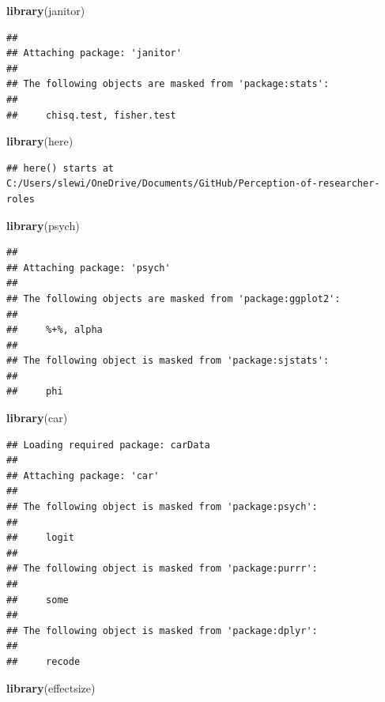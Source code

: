 \documentclass[
]{article}
\newenvironment{Shaded}{\begin{snugshade}}{\end{snugshade}}
\newcommand{\FunctionTok}[1]{\textcolor[rgb]{0.13,0.29,0.53}{\textbf{#1}}}
\newcommand{\NormalTok}[1]{#1}
\begin{document}
\begin{Shaded}
\begin{Highlighting}[]
\FunctionTok{library}\NormalTok{(janitor)}
\end{Highlighting}
\end{Shaded}

\begin{verbatim}
## 
## Attaching package: 'janitor'
## 
## The following objects are masked from 'package:stats':
## 
##     chisq.test, fisher.test
\end{verbatim}

\begin{Shaded}
\begin{Highlighting}[]
\FunctionTok{library}\NormalTok{(here)}
\end{Highlighting}
\end{Shaded}

\begin{verbatim}
## here() starts at C:/Users/slewi/OneDrive/Documents/GitHub/Perception-of-researcher-roles
\end{verbatim}

\begin{Shaded}
\begin{Highlighting}[]
\FunctionTok{library}\NormalTok{(psych)}
\end{Highlighting}
\end{Shaded}

\begin{verbatim}
## 
## Attaching package: 'psych'
## 
## The following objects are masked from 'package:ggplot2':
## 
##     %+%, alpha
## 
## The following object is masked from 'package:sjstats':
## 
##     phi
\end{verbatim}

\begin{Shaded}
\begin{Highlighting}[]
\FunctionTok{library}\NormalTok{(car)}
\end{Highlighting}
\end{Shaded}

\begin{verbatim}
## Loading required package: carData
## 
## Attaching package: 'car'
## 
## The following object is masked from 'package:psych':
## 
##     logit
## 
## The following object is masked from 'package:purrr':
## 
##     some
## 
## The following object is masked from 'package:dplyr':
## 
##     recode
\end{verbatim}

\begin{Shaded}
\begin{Highlighting}[]
\FunctionTok{library}\NormalTok{(effectsize)}
\end{Highlighting}
\end{Shaded}
\end{document}
